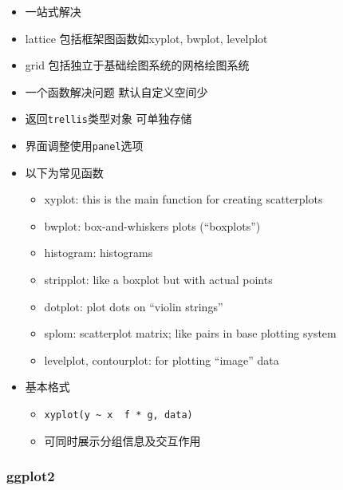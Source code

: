 \documentclass[
]{book}
\providecommand{\tightlist}{%
  \setlength{\itemsep}{0pt}\setlength{\parskip}{0pt}}
\begin{document}
\begin{itemize}
\tightlist
\item
  一站式解决
\item
  lattice 包括框架图函数如xyplot, bwplot, levelplot
\item
  grid 包括独立于基础绘图系统的网格绘图系统
\item
  一个函数解决问题 默认自定义空间少
\item
  返回\texttt{trellis}类型对象 可单独存储
\item
  界面调整使用\texttt{panel}选项
\item
  以下为常见函数

  \begin{itemize}
  \tightlist
  \item
    xyplot: this is the main function for creating scatterplots
  \item
    bwplot: box-and-whiskers plots (``boxplots'')
  \item
    histogram: histograms
  \item
    stripplot: like a boxplot but with actual points
  \item
    dotplot: plot dots on ``violin strings''
  \item
    splom: scatterplot matrix; like pairs in base plotting system
  \item
    levelplot, contourplot: for plotting ``image'' data
  \end{itemize}
\item
  基本格式

  \begin{itemize}
  \tightlist
  \item
    \texttt{xyplot(y\ \textasciitilde{}\ x\ \textbar{}\ f\ *\ g,\ data)}
  \item
    可同时展示分组信息及交互作用
  \end{itemize}
\end{itemize}

\hypertarget{ggplot2}{%
\subsubsection{ggplot2}\label{ggplot2}}
\end{document}
